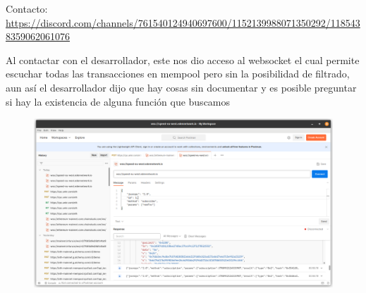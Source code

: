 Contacto: \url{https://discord.com/channels/761540124940697600/1152139988071350292/1185438359062061076} 

Al contactar con el desarrollador, este nos dio acceso al websocket el cual permite escuchar todas las transacciones en mempool pero sin la posibilidad de filtrado, aun así el desarrollador dijo que hay cosas sin documentar y es posible preguntar si hay la existencia de alguna función que buscamos

\begin{figure}
    \centering
    \includegraphics[width=1\linewidth]{img//screenshots/Screenshot from 2023-12-16 00-58-51.png}
\end{figure}

